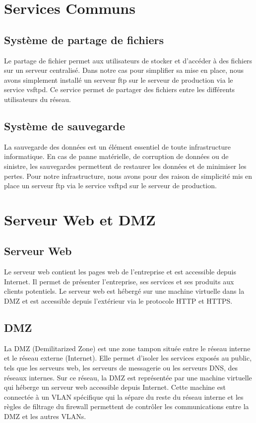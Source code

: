 \documentclass[a4paper,12pt]{report}
\begin{document}
        \section{Services Communs}
            \subsection{Système de partage de fichiers}
                Le partage de fichier permet aux utilisateurs de stocker et d'accéder à des fichiers sur un serveur centralisé. Dans notre cas pour simplifier sa mise en place, nous avons simplement installé un serveur ftp sur le serveur de production via le service vsftpd. Ce service permet de partager des fichiers entre les différents utilisateurs du réseau.
            \subsection{Système de sauvegarde}
                La sauvegarde des données est un élément essentiel de toute infrastructure informatique. En cas de panne matérielle, de corruption de données ou de sinistre, les sauvegardes permettent de restaurer les données et de minimiser les pertes. Pour notre infrastructure, nous avons pour des raison de simplicité mis en place un serveur ftp via le service vsftpd sur le serveur de production.
        \section{Serveur Web et DMZ}
            \subsection{Serveur Web}
                Le serveur web contient les pages web de l'entreprise et est accessible depuis Internet. Il permet de présenter l'entreprise, ses services et ses produits aux clients potentiels. Le serveur web est hébergé sur une machine virtuelle dans la DMZ et est accessible depuis l'extérieur via le protocole HTTP et HTTPS.
            \subsection{DMZ}
                La DMZ (Demilitarized Zone) est une zone tampon située entre le réseau interne et le réseau externe (Internet). Elle permet d'isoler les services exposés au public, tels que les serveurs web, les serveurs de messagerie ou les serveurs DNS, des réseaux internes. Sur ce réseau, la DMZ est représentée par une machine virtuelle qui héberge un serveur web accessible depuis Internet. Cette machine est connectée à un VLAN spécifique qui la sépare du reste du réseau interne et les règles de filtrage du firewall permettent de contrôler les communications entre la DMZ et les autres VLANs.
\end{document}
